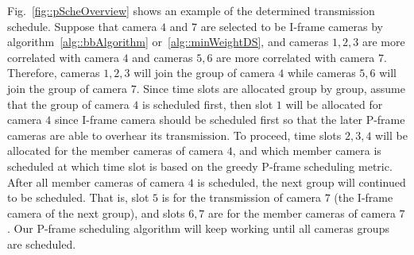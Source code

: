 Fig.~\ref{fig::pScheOverview} shows an example of the determined transmission schedule.
Suppose that camera $4$ and $7$ are selected to be I-frame cameras by algorithm~\ref{alg::bbAlgorithm} or~\ref{alg::minWeightDS}, and cameras $1,2,3$ are more correlated with camera $4$ and cameras $5,6$ are more correlated with camera $7$.
Therefore, cameras $1,2,3$ will join the group of camera $4$ while cameras $5,6$ will join the group of camera $7$.
Since time slots are allocated group by group, assume that the group of camera $4$ is scheduled first, then slot $1$ will be allocated for camera $4$ since I-frame camera should be scheduled first so that the later P-frame cameras are able to overhear its transmission.
To proceed, time slots $2,3,4$ will be allocated for the member cameras of camera $4$, and which member camera is scheduled at which time slot is based on the greedy P-frame scheduling metric.
After all member cameras of camera $4$ is scheduled, the next group will continued to be scheduled.
That is, slot $5$ is for the transmission of camera $7$ (the I-frame camera of the next group), and slots $6,7$ are for the member cameras of camera $7$.
Our P-frame scheduling algorithm will keep working until all cameras groups are scheduled.
%
%
%